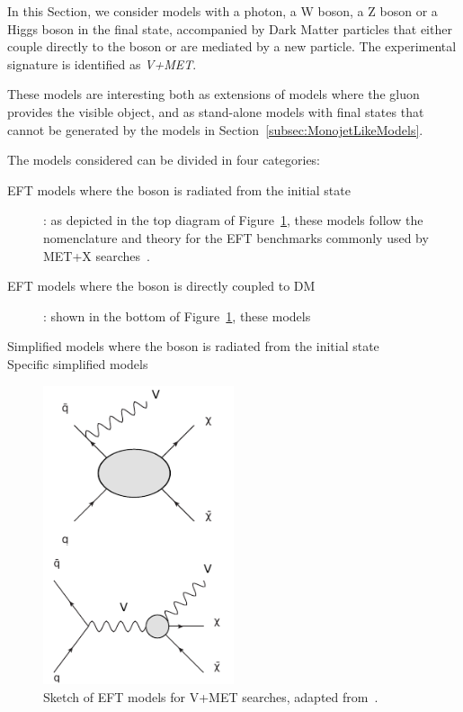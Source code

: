 
In this Section, we consider models with a photon, a W boson, a Z boson or a Higgs boson in the final state, 
accompanied by Dark Matter particles that either couple directly to the boson or are mediated by 
a new particle. The experimental signature is identified as \textit{V+MET}. 

These models are interesting both as extensions of models where the gluon provides the visible object,
and as stand-alone models with final states that cannot be generated by the models in
Section~\ref{subsec:MonojetLikeModels}.


The models considered can be divided in four categories:
\begin{description}
 \item[EFT models where the boson is radiated from the initial state]: as depicted in 
 the top diagram of Figure~\ref{fig:VPlusMET_EFT}, these  models follow the nomenclature and theory 
 for the EFT benchmarks commonly used by MET+X searches~\cite{Goodman:2010ku}. 
 \item[EFT models where the boson is directly coupled to DM]: shown in the bottom of Figure~\ref{fig:VPlusMET_EFT},
 these models 
 \item[Simplified models where the boson is radiated from the initial state]
 \item[Specific simplified models]
\end{description}

\begin{figure}[h!]
  \centering
    \includegraphics[width=0.5\textwidth]{figures/VPlusMET_EFT}
  \caption{Sketch of EFT models for V+MET searches, adapted from~\citep{Nelson:2013pqa}. \label{fig:VPlusMET_EFT}}
\end{figure}